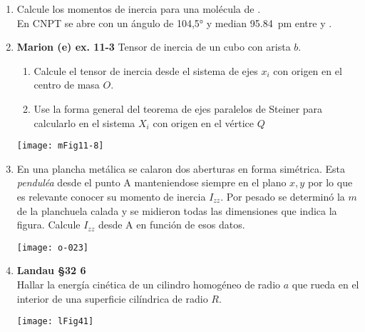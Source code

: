 \documentclass[11pt, spanish, a4paper, twoside]{article}
\begin{document}
\begin{enumerate}
\item Calcule los momentos de inercia para una molécula de .\\
En CNPT se abre con un ángulo de \ang{104,5;;} y median \SI{95.84}{\pico\metre} entre  y .



\item 
\begin{minipage}[t][3.7cm]{0.6\textwidth}
\textbf{Marion (e) ex. 11-3} Tensor de inercia de un cubo con arista \(b\).
	\begin{enumerate}
	\item Calcule el tensor de inercia desde el sistema de ejes \(x_i\) con origen en el centro de masa \(O\).
	\item Use la forma general del teorema de ejes paralelos de Steiner para calcularlo en el sistema \(X_i\) con origen en el vértice \(Q\) 
	\end{enumerate}
\end{minipage}
\begin{minipage}[c][1.2cm][t]{0.35\textwidth}
	\texttt{[image: mFig11-8]}
\end{minipage}



\item 
\begin{minipage}[t][3.5cm]{0.5\textwidth}
En una plancha metálica se calaron dos aberturas en forma simétrica.
Esta \emph{penduléa} desde el punto A manteniendose siempre en el plano \(x,y\) por lo que es relevante conocer su momento de inercia \(I_{zz}\).
Por pesado se determinó la $m$ de la planchuela calada y se midieron todas las dimensiones que indica la figura.
Calcule \(I_{zz}\) desde A en función de esos datos.
\end{minipage}
\begin{minipage}[c][1.5cm][t]{0.45\textwidth}
	\texttt{[image: o-023]}
\end{minipage}



\item 
\begin{minipage}[t][1.3cm]{0.65\textwidth}
\textbf{Landau \S 32 6}\\%
	Hallar la energía cinética de un cilindro homogéneo de radio \(a\) que rueda en el interior de una superficie cilíndrica de radio \(R\).
\end{minipage}
\begin{minipage}[c][1.5cm][t]{0.3\textwidth}
\texttt{[image: lFig41]}
\end{minipage}




\end{enumerate}
\end{document}
